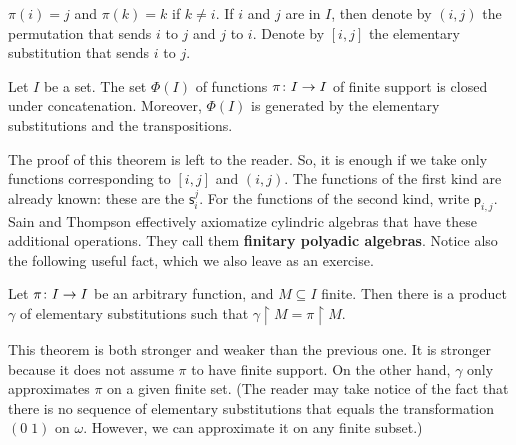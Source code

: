 $\pi(i) = j$ and $\pi(k) = k$ if $k \neq i$. If $i$ and $j$ are in
$I$, then denote by $(i,j)$ the permutation that sends $i$ to $j$
and $j$ to $i$. Denote by $[i,j]$ the elementary substitution that
sends $i$ to $j$.
\begin{prop}
\label{prop:support}
Let $I$ be a set. The set $\Phi(I)$ of functions $\pi \colon I \rightarrow I$
of finite support is closed under concatenation. Moreover,
$\Phi(I)$ is generated by the elementary substitutions and the
transpositions.
\end{prop}
The proof of this theorem is left to the reader. So,  it is enough 
if we take only functions corresponding to $[i,j]$ and $(i,j)$. The 
functions of the first kind are already known: these are 
the $\mathsf{s}^j_i$. For the functions of the second kind, 
write $\mathsf{p}_{i,j}$. Sain and Thompson effectively axiomatize
cylindric algebras that have these additional operations. They
call them \textbf{finitary polyadic algebras}. 
Notice also the following useful fact, which we also leave as an exercise.
\begin{prop}
\label{prop:approx} Let $\pi \colon I \rightarrow I$ be an arbitrary function,
and $M \subseteq I$ finite. Then there is a product $\gamma$ of
elementary substitutions such that $\gamma \restriction M = \pi
\restriction M$.
\end{prop}
This theorem is both stronger and weaker than the previous one. It
is stronger because it does not assume $\pi$ to have finite
support. On the other hand, $\gamma$ only approximates $\pi$ on a
given finite set. (The reader may take notice of the fact that
there is no sequence of elementary substitutions that equals the
transformation $(0\; 1)$ on $\omega$. However, we can approximate
it on any finite subset.)

